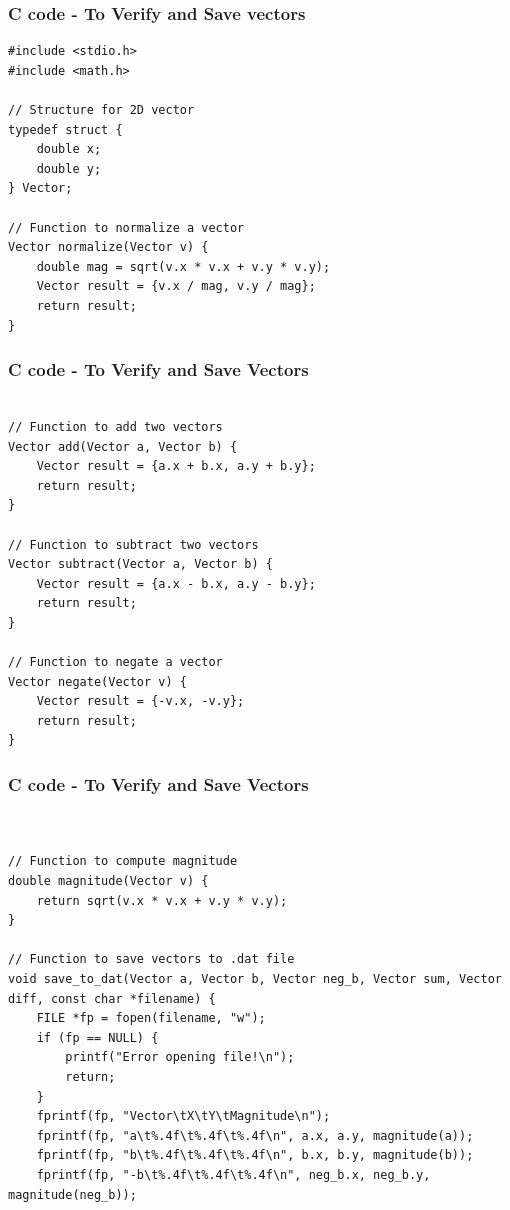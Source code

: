 \documentclass{beamer}
\begin{document}
\begin{frame}[fragile]                            
\frametitle{C code - To Verify and Save vectors}                
\begin{lstlisting}
#include <stdio.h>
#include <math.h>

// Structure for 2D vector
typedef struct {
    double x;
    double y;
} Vector;

// Function to normalize a vector
Vector normalize(Vector v) {
    double mag = sqrt(v.x * v.x + v.y * v.y);
    Vector result = {v.x / mag, v.y / mag};
    return result;
}
 \end{lstlisting}
\end{frame}


\begin{frame}[fragile]                            
\frametitle{C code - To Verify and Save Vectors}                
\begin{lstlisting}

// Function to add two vectors
Vector add(Vector a, Vector b) {
    Vector result = {a.x + b.x, a.y + b.y};
    return result;
}

// Function to subtract two vectors
Vector subtract(Vector a, Vector b) {
    Vector result = {a.x - b.x, a.y - b.y};
    return result;
}

// Function to negate a vector
Vector negate(Vector v) {
    Vector result = {-v.x, -v.y};
    return result;
}
 \end{lstlisting}
\end{frame}


\begin{frame}[fragile]                            
\frametitle{C code - To Verify and Save Vectors}                
\begin{lstlisting}


// Function to compute magnitude
double magnitude(Vector v) {
    return sqrt(v.x * v.x + v.y * v.y);
}

// Function to save vectors to .dat file
void save_to_dat(Vector a, Vector b, Vector neg_b, Vector sum, Vector diff, const char *filename) {
    FILE *fp = fopen(filename, "w");
    if (fp == NULL) {
        printf("Error opening file!\n");
        return;
    }
    fprintf(fp, "Vector\tX\tY\tMagnitude\n");
    fprintf(fp, "a\t%.4f\t%.4f\t%.4f\n", a.x, a.y, magnitude(a));
    fprintf(fp, "b\t%.4f\t%.4f\t%.4f\n", b.x, b.y, magnitude(b));
    fprintf(fp, "-b\t%.4f\t%.4f\t%.4f\n", neg_b.x, neg_b.y, magnitude(neg_b));
 \end{lstlisting}
\end{frame}
\end{document}
